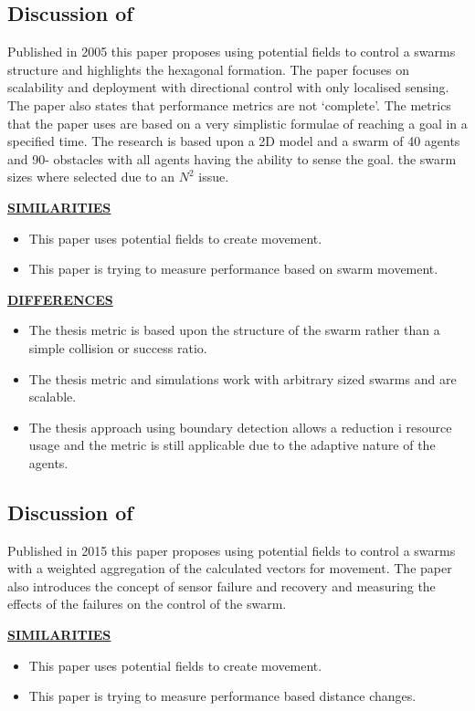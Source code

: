 \documentclass[a4paper,11pt,nocenter,bold,notitlepage,noheadline,noindent]{
thesis}
\begin{document}
\subsection{Discussion of \cite{HS:05}} 
Published in 2005 this paper proposes using potential fields to control a swarms structure and highlights the hexagonal formation. The paper focuses on scalability and deployment with directional control with only localised sensing. The paper also states that performance metrics are not `complete'. The metrics that the paper uses are based on a very simplistic formulae of reaching a goal in a specified time. The research is based upon a 2D model and a swarm of 40 agents and 90- obstacles with all agents having the ability to sense the goal. the swarm sizes where selected due to an $N^2$ issue.  

\textbf{\underline{SIMILARITIES}}
\begin{itemize}
   \setlength\itemsep{0em}
	\item This paper uses potential fields to create movement.
	\item This paper is trying to measure performance based on swarm movement.
\end{itemize} 

\textbf{\underline{DIFFERENCES}}
\begin{itemize}
   \setlength\itemsep{0em}
	\item The thesis metric is based upon the structure of the swarm rather than a simple collision or success ratio.
	\item The thesis metric and simulations work with arbitrary sized swarms and are scalable.
	\item The thesis approach using boundary detection allows a reduction i resource usage and the metric is still applicable due to the adaptive nature of the agents.
\end{itemize} 

\subsection{Discussion of \cite{RMT:15}} 
Published in 2015 this paper proposes using potential fields to control a swarms with a weighted aggregation of the calculated vectors for movement. The paper also introduces the concept of sensor failure and recovery and measuring the effects of the failures on the control of the swarm.  

\textbf{\underline{SIMILARITIES}}
\begin{itemize}
   \setlength\itemsep{0em}
	\item This paper uses potential fields to create movement.
	\item This paper is trying to measure performance based distance changes.
\end{itemize} 
\end{document}
